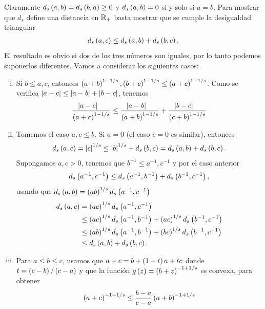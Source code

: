 \begin{dem}
	Claramente $d_{s}\left( a,b \right) = d_{s}\left( b,a \right) \ge 0$ y $d_{s}\left( a,b \right) = 0$ si y solo si $a = b$.
	Para mostrar que $d_{s}$ define una distancia en $\mathbb{R}_{+}$ basta mostrar que se cumple la desigualdad triangular
	\begin{align*}
	d_{s}\left( a,c \right) \le d_{s}\left( a,b \right) + d_{s}\left( b,c \right).
	\end{align*}
	El resultado es obvio si dos de los tres números son iguales, por lo tanto podemos suponerlos diferentes. Vamos a considerar los siguientes casos:
	\begin{enumerate}[i)]
		\item Si $b \le a,c$, entonces $\left( a + b \right)^{1-1/s},\left( b + c \right)^{1-1/s} \le \left( a + c \right)^{1-1/s}$.
		Como se verifica $\left| a-c \right| \le \left| a-b \right| + \left| b-c \right|$, tenemos
		\begin{align*}
		\dfrac{\left| a - c \right|\ \ \ }{\left( a + c \right)^{1-1/s}} \le \dfrac{\left| a - b \right|\ \ \ }{\left( a + b \right)^{1-1/s}} 
		+ \dfrac{\left| b - c \right|\ \ \ }{\left( c + b \right)^{1-1/s}}
		\end{align*}
		\item Tomemos el caso $a,c \le b$. Si $a=0$ (el caso $c=0$ es similar), entonces 
		\begin{align*}
		d_{s}\left( a,c \right) = \left| c \right|^{1/s} \le \left| b \right|^{1/s} + d_{s}\left( b,c \right) = d_{s}\left( a,b \right) + d_{s}\left( b,c \right).
		\end{align*}
		Supongamos $a,c>0$, tenemos que $b^{-1} \le a^{-1},c^{-1}$ y por el caso anterior
		\begin{align*}
		d_{s}\left( a^{-1},c^{-1} \right) \le d_{s}\left( a^{-1},b^{-1} \right) + d_{s}\left( b^{-1},c^{-1} \right),
		\end{align*}
		usando que $d_{s}\left( a,b \right) = \left( a b \right)^{1/s}d_{s}\left( a^{-1},c^{-1} \right)$
		\begin{align*}
		d_{s}\left( a,c \right) & = \left( a c \right)^{1/s} d_{s}\left( a^{-1},c^{-1} \right) \\
		& \le \left( a c \right)^{1/s} d_{s}\left( a^{-1},b^{-1} \right) + \left( a c \right)^{1/s} d_{s}\left( b^{-1},c^{-1} \right) \\
		& \le \left( a b \right)^{1/s} d_{s}\left( a^{-1},b^{-1} \right) + \left( b c \right)^{1/s} d_{s}\left( b^{-1},c^{-1} \right) \\
		& \le d_{s}\left( a,b \right) + d_{s}\left( b,c \right).
		\end{align*}
		\item Para $a \le b \le c$, usamos que $a + c = b + \left( 1-t \right) a + t c$
		donde $t = \left( c-b \right)/\left( c-a \right)$ y que la función $g\left( z \right) = \left( b+z \right)^{-1+1/s}$ es convexa, para obtener
		\begin{align*}
		\pa{a+c}^{-1+1/s} \le \frac{b-a}{c-a} \pa{a+b}^{-1+1/s}

\end{align*}
\end{enumerate}
\end{dem}
